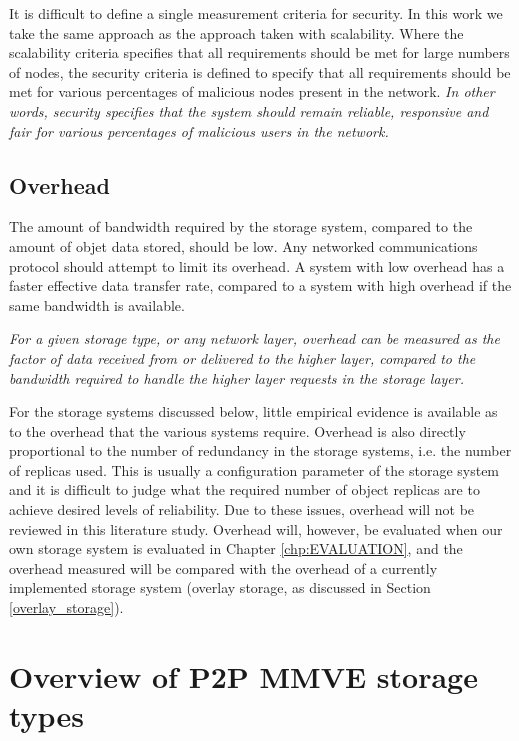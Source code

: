 It is difficult to define a single measurement criteria for security. In this work we take the same approach as the approach taken with scalability. Where the scalability criteria specifies that all requirements should be met for large numbers of nodes, the security criteria is defined to specify that all requirements should be met for various percentages of malicious nodes present in the network. \emph{In other words, security specifies that the system should remain reliable, responsive and fair for various percentages of malicious users in the network.}

\subsection{Overhead}
\label{characteristics_overhead}

The amount of bandwidth required by the storage system, compared to the amount of objet data stored, should be low. Any networked communications protocol should attempt to limit its overhead. A system with low overhead has a faster effective data transfer rate, compared to a system with high overhead if the same bandwidth is available.

\emph{For a given storage type, or any network layer, overhead can be measured as the factor of data received from or delivered to the higher layer, compared to the bandwidth required to handle the higher layer requests in the storage layer.}

For the storage systems discussed below, little empirical evidence is available as to the overhead that the various systems require. Overhead is also directly proportional to the number of redundancy in the storage systems, i.e. the number of replicas used. This is usually a configuration parameter of the storage system and it is difficult to judge what the required number of object replicas are to achieve desired levels of reliability. Due to these issues, overhead will not be reviewed in this literature study. Overhead will, however, be evaluated when our own storage system is evaluated in Chapter \ref{chp:EVALUATION}, and the overhead measured will be compared with the overhead of a currently implemented storage system (overlay storage, as discussed in Section \ref{overlay_storage}).

\section{Overview of P2P MMVE storage types}
\label{storage_type_overview}

